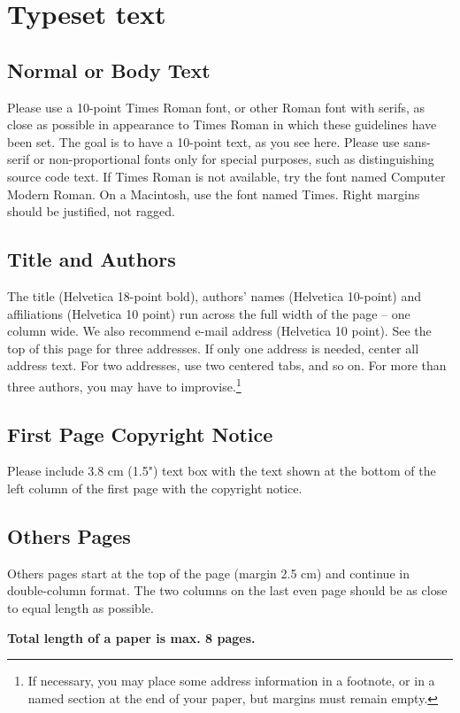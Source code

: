\documentclass[twoside,twocolumn,10pt]{article}
\begin{document}
\section{Typeset text}
\subsection*{Normal or Body Text}
Please use a 10-point Times Roman font, or other Roman font with serifs, as close as possible in appearance to Times Roman in which these guidelines have been set. The goal is to have a 10-point text, as you see here. Please use sans-serif or non-proportional fonts only for special purposes, such as distinguishing source code text. If Times Roman is not available, try the font named Computer Modern Roman. On a Macintosh, use the font named Times.  Right margins should be justified, not ragged.

\subsection*{Title and Authors}
The title (Helvetica 18-point bold), authors' names (Helvetica 10-point) and affiliations (Helvetica 10 point) run across the full width of the page -- one column wide. We also recommend e-mail address (Helvetica 10 point). See the top of this page for three addresses. If only one address is needed, center all address text. For two addresses, use two centered tabs, and so on. For more than three authors, you may have to improvise.\footnote{If necessary, you may place some address information in a footnote, or in a named section at the end of your paper, but margins must remain empty.} 

\subsection*{First Page Copyright Notice}
Please include 3.8 cm (1.5") text box with the text shown at the bottom of the left column of the first page with the copyright notice.

\subsection*{Others Pages}
Others pages start at the top of the page (margin 2.5 cm) and continue in double-column format.  The two columns on the last even page should be as close to equal length as possible. 

{\bfseries Total length of a paper is max. 8 pages.}
\end{document}
